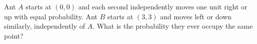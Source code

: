 Ant $A$ starts at $(0,0)$ and each second independently moves one unit right or up with equal probability. Ant $B$ starts at $(3,3)$ and moves left or down similarly, independently of $A$. What is the probability they ever occupy the same point?
